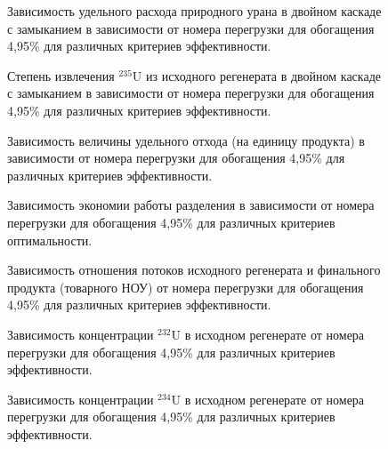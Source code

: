 {\begin{figure}[ht]
    \centering
    \begin{minipage}{.5\textwidth}
      \centering
      
      \caption{{Зависимость удельного расхода природного урана в двойном каскаде с замыканием в зависимости от номера перегрузки для обогащения 4,95\% для различных критериев эффективности.{\label{3}}}}
    \end{minipage}%
    \begin{minipage}{.5\textwidth}
      \centering
      
\caption{{Степень извлечения $^{235}$U из исходного регенерата в двойном каскаде с замыканием в зависимости от номера перегрузки для обогащения 4,95\% для различных критериев эффективности.{\label{4}}}}
\end{minipage}
\end{figure}



\begin{figure}[ht]
    \centering
    \begin{minipage}{.5\textwidth}
      \centering
      
      \caption{{Зависимость величины удельного отхода (на единицу продукта) в зависимости от номера перегрузки для обогащения 4,95\% для различных критериев эффективности.{\label{5}}}}
    \end{minipage}%
    \begin{minipage}{.5\textwidth}
      \centering
      
\caption{{Зависимость экономии работы разделения в зависимости от номера перегрузки для обогащения 4,95\% для различных критериев оптимальности.{\label{6}}}}
\end{minipage}
\end{figure}

\begin{figure}[ht]
    \centering
    
    \caption{Зависимость отношения потоков исходного регенерата и финального продукта (товарного НОУ) от номера перегрузки для обогащения 4,95\% для различных критериев эффективности.}\label{7}
\end{figure}



\begin{figure}[ht]
    \centering
    \begin{minipage}{.5\textwidth}
      \centering
      
      \caption{{Зависимость концентрации $^{232}$U в исходном регенерате от номера перегрузки для обогащения 4,95\% для различных критериев эффективности.{\label{8}}}}
    \end{minipage}%
    \begin{minipage}{.5\textwidth}
      \centering
      
\caption{{Зависимость концентрации $^{234}$U в исходном регенерате от номера перегрузки для обогащения 4,95\% для различных критериев эффективности.{\label{9}}}}
\end{minipage}
\end{figure}


}
